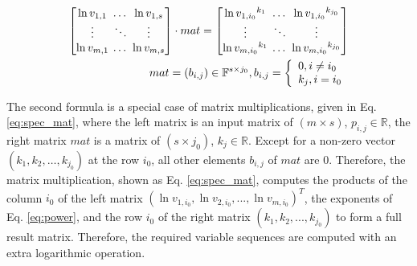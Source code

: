 \begin{equation}
    \label{eq:spec_mat}
    \begin{aligned}
        \setlength{\arraycolsep}{2pt}
        \begin{bmatrix} 
            \ln v_{1, 1}    & \dots     & \ln v_{1, s}  \\
            \vdots      & \ddots    & \vdots    \\
            \ln v_{m, 1}    & \dots     & \ln v_{m, s} 
        \end{bmatrix}
        \cdot
        mat
        =
        \begin{bmatrix}
            \ln {v_{1, i_0}}^{k_1} & \dots     & \ln {v_{1, i_0}}^{k_{j_0}}  \\
            \vdots          & \ddots    & \vdots                \\
            \ln {v_{m, i_0}}^{k_1}  & \dots    & \ln {v_{m, i_0}}^{k_{j_0}}  \\
        \end{bmatrix} \\
        mat = (b_{i, j}) \in \mathbb{F}^{s \times j_0}, 
        b_{i, j} = \left\{
                        \begin{array}{lc}
                            0, i \neq i_{0} \\
                            k_j, i = i_{0}
                        \end{array}
                    \right.
    \end{aligned}
    \end{equation}

The second formula is a special case of matrix multiplications, given in Eq. \ref{eq:spec_mat}, where the left matrix is an input matrix of $(m \times s)$, $p_{i, j} \in \mathbb{R}$, the right matrix $mat$ is a matrix of $(s \times j_0)$, $k_{j} \in \mathbb{R}$. Except for a non-zero vector $(k_1, k_2, \dots, k_{j_0})$ at the row $i_0$, all other elements $b_{i, j}$ of $mat$ are $0$. Therefore, the matrix multiplication, shown as Eq. \ref{eq:spec_mat}, computes the products of the column $i_0$ of the left matrix $(\ln v_{1, i_0}, \ln v_{2, i_0}, ..., \ln v_{m, i_0})^{T}$, the exponents of Eq. \ref{eq:power}, and the row $i_0$ of the right matrix $(k_1, k_2, ..., k_{j_0})$ to form a full result matrix. Therefore, the required variable sequences are computed with an extra logarithmic operation.

